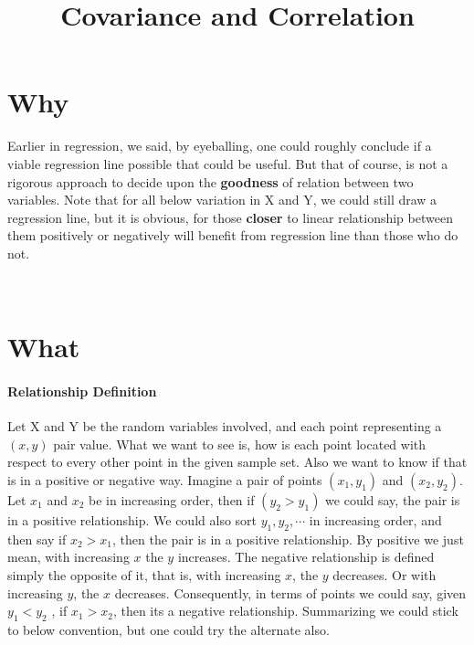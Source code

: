 \documentclass[float=false,crop=false]{standalone}
\title{Covariance and Correlation}
\begin{document}
    
    
    \maketitle
    
    

    \section{Why}\label{why}

Earlier in regression, we said, by eyeballing, one could roughly
conclude if a viable regression line possible that could be useful. But
that of course, is not a rigorous approach to decide upon the
\textbf{goodness} of relation between two variables. Note that for all
below variation in X and Y, we could still draw a regression line, but
it is obvious, for those \textbf{closer} to linear relationship between
them positively or negatively will benefit from regression line than
those who do not.
    \begin{center}
    \end{center}
    { \hspace*{\fill} \\}
    
    \section{What}\label{what}

\paragraph{Relationship Definition}\label{relationship-definition}

Let X and Y be the random variables involved, and each point
representing a \((x,y)\) pair value. What we want to see is, how is each
point located with respect to every other point in the given sample set.
Also we want to know if that is in a positive or negative way. Imagine a
pair of points \((x_1,y_1)\) and \((x_2,y_2)\). Let \(x_1\) and \(x_2\)
be in increasing order, then if \((y_2 > y_1)\) we could say, the pair
is in a positive relationship. We could also sort \(y_1,y_2,\cdots\) in
increasing order, and then say if \(x_2 > x_1\), then the pair is in a
positive relationship. By positive we just mean, with increasing \(x\)
the \(y\) increases. The negative relationship is defined simply the
opposite of it, that is, with increasing \(x\), the \(y\) decreases. Or
with increasing \(y\), the \(x\) decreases. Consequently, in terms of
points we could say, given \(y_1<y_2\) , if \(x_1 > x_2\), then its a
negative relationship. Summarizing we could stick to below convention,
but one could try the alternate also.
\end{document}
